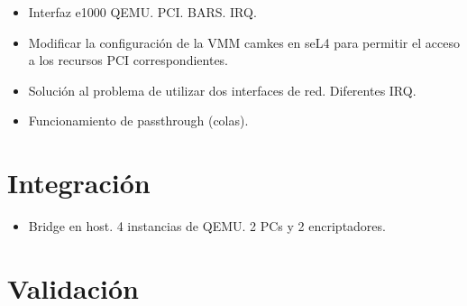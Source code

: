 \begin{itemize}
    \item Interfaz e1000 QEMU. PCI. BARS. IRQ.
    \item Modificar la configuración de la VMM camkes en seL4 para permitir el acceso a los recursos PCI correspondientes.
    \item Solución al problema de utilizar dos interfaces de red. Diferentes IRQ.
    \item Funcionamiento de passthrough (colas).
\end{itemize}

\section{Integración}
\begin{itemize}
    \item Bridge en host. 4 instancias de QEMU. 2 PCs y 2 encriptadores.
\end{itemize}

\section{Validación} %
